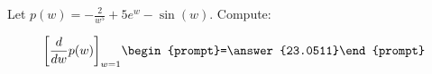 \documentclass{ximera}
\author{Bart Snapp}
\begin{document}
\begin{exercise}

Let $p(w) = -\frac{2}{w^5}+5 e^w-\sin (w)$. Compute:

\[
\eval{\dd{w}p(w)}_{w=1}
\begin{prompt}=\answer{23.0511}\end{prompt}
\]
\end{exercise}
\end{document}
